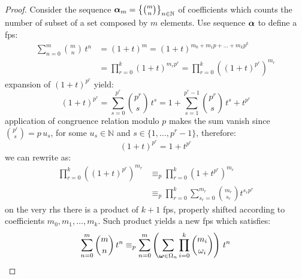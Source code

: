\begin{proof}
    Consider the sequence $\boldsymbol{\alpha}_{m}=\left\lbrace{{m}\choose{n}}\right\rbrace_{n\in\mathbb{N}}$ 
    of coefficients which counts the number of subset
    of a set composed by $m$ elements. Use sequence $\boldsymbol{\alpha}$ to define a \ac{fps}:
    \begin{displaymath}
        \begin{split}
            \sum_{n=0}^{m}{{{m}\choose{n}}\,t^{n}} &= \left(1+t\right)^{m}
                = \left(1+t\right)^{m_{0}+m_{1}p+\ldots+m_{k}p^{k}}\\
                &= \prod_{r=0}^{k}{{\left(1+t\right)^{m_{r}p^{r}}}}
                = \prod_{r=0}^{k}{\left(\left(1+t\right)^{p^{r}}\right)^{m_{r}}}
        \end{split}
    \end{displaymath}
    expansion of $\left(1+t\right)^{p^{r}}$ yield: 
    \begin{displaymath}
            \left(1+t\right)^{p^{r}} = \sum_{s=0}^{p^{r}}{{{p^{r}}\choose{s}}\,t^{s}}
                = 1+\sum_{s=1}^{p^{r}-1}{{{p^{r}}\choose{s}}\,t^{s}}+t^{p^{r}}
    \end{displaymath}
    application of congruence relation modulo $p$ makes the sum vanish since ${{p^{r}}\choose{s}}=p\,u_{s}$,
    for some $u_{s}\in\mathbb{N}$ and $s\in\lbrace 1,\ldots,p^{r}-1\rbrace$, therefore:
    \begin{displaymath}
        \left(1+t\right)^{p^{r}} = 1+t^{p^{r}}
    \end{displaymath}
    we can rewrite as:
    \begin{displaymath}
        \begin{split}
            \prod_{r=0}^{k}{\left(\left(1+t\right)^{p^{r}}\right)^{m_{r}}}
                &\equiv_{p} \prod_{r=0}^{k}{\left(1+t^{p^{r}}\right)^{m_{r}}}\\
                &\equiv_{p} \prod_{r=0}^{k}{\sum_{s_{r}=0}^{m_{r}}{{{m_{r}}\choose{s_{r}}}t^{s_{r}p^{r}}}}
        \end{split}
    \end{displaymath}
    on the very \ac{rhs} there is a product of $k+1$ \ac{fps}, properly shifted according to coefficients
    $m_{0},m_{1},\ldots,m_{k}$. Such product yields a new \ac{fps} which satisfies:
    \begin{displaymath}
        \sum_{n=0}^{m}{{{m}\choose{n}}\,t^{n}} 
        \equiv_{p}
        \sum_{n=0}^{m}{\left(\sum_{\vect{\omega}\in\Omega_{n}}{\prod_{i=0}^{k}{{{m_{i}}\choose{\omega_{i}}}}}\right)\,t^{n}}

\end{displaymath}
\end{proof}
